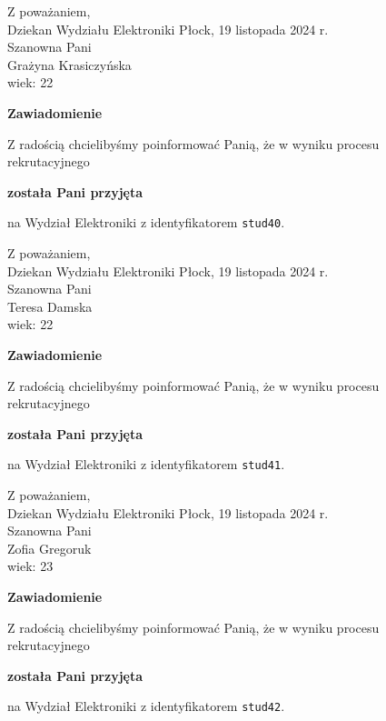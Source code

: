 \documentclass[12pt,a4paper]{article}
\begin{document}
\noindent
Z poważaniem,\\
Dziekan
Wydziału Elektroniki
\newpage
\hfill Płock, 19 listopada 2024 r.\\ 
\noindent 
Szanowna Pani \\
Grażyna Krasiczyńska \\
wiek: 22

\bigskip

\begin{center}
{\Large\textbf{Zawiadomienie}}
\end{center}
\bigskip
Z radością chcielibyśmy poinformować Panią, że w wyniku procesu rekrutacyjnego
\begin{center}
\textsf{\textbf{została Pani przyjęta}} 
\end{center}
na Wydział Elektroniki z identyfikatorem \verb|stud40|.
\vspace{2cm}

\noindent
Z poważaniem,\\
Dziekan
Wydziału Elektroniki
\newpage
\hfill Płock, 19 listopada 2024 r.\\ 
\noindent 
Szanowna Pani \\
Teresa Damska \\
wiek: 22

\bigskip

\begin{center}
{\Large\textbf{Zawiadomienie}}
\end{center}
\bigskip
Z radością chcielibyśmy poinformować Panią, że w wyniku procesu rekrutacyjnego
\begin{center}
\textsf{\textbf{została Pani przyjęta}} 
\end{center}
na Wydział Elektroniki z identyfikatorem \verb|stud41|.
\vspace{2cm}

\noindent
Z poważaniem,\\
Dziekan
Wydziału Elektroniki
\newpage
\hfill Płock, 19 listopada 2024 r.\\ 
\noindent 
Szanowna Pani \\
Zofia Gregoruk \\
wiek: 23

\bigskip

\begin{center}
{\Large\textbf{Zawiadomienie}}
\end{center}
\bigskip
Z radością chcielibyśmy poinformować Panią, że w wyniku procesu rekrutacyjnego
\begin{center}
\textsf{\textbf{została Pani przyjęta}} 
\end{center}
na Wydział Elektroniki z identyfikatorem \verb|stud42|.
\vspace{2cm}
\end{document}
